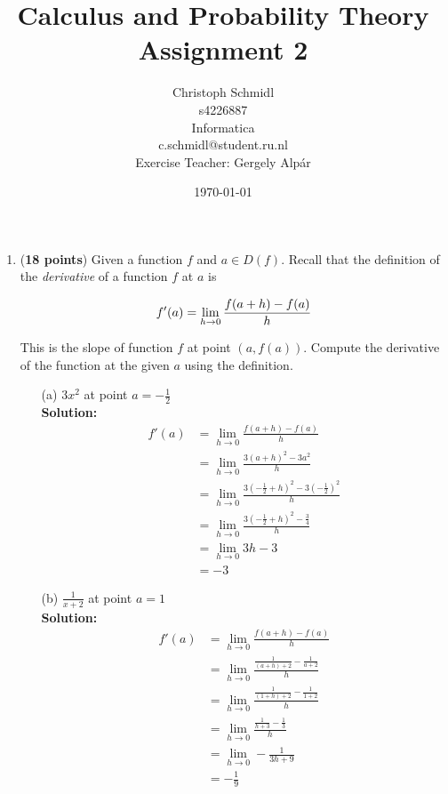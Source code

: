 \documentclass[a4paper]{article}
\title{Calculus and Probability Theory\\ Assignment 2}
\author{Christoph Schmidl\\
s4226887\\
Informatica\\
c.schmidl@student.ru.nl\\
Exercise Teacher: Gergely Alp\'{a}r}
\date{\today}
\begin{document}
\maketitle

\begin{enumerate}

\item (\textbf{18 points}) Given a function $f$ and $a \in D(f)$. Recall that the definition of the \textit{derivative} of a function $f$ at $a$ is 

\begin{equation}
	f'(a) = \lim_{h \to 0} \frac{f(a + h) - f(a)}{h} \notag
\end{equation}

This is the slope of function $f$ at point $(a, f(a))$. Compute the derivative of the function at the given $a$ using the definition.

\begin{enumerate}
	\item[(a)] $3x^2$ at point $a = -\frac{1}{2}$\\
	\textbf{Solution:}\\
	
	
\begin{align*}
	f'(a) &= \lim_{h \to 0} \frac{f(a + h) - f(a)}{h}\\
	&= \lim_{h \to 0} \frac{3(a + h)^2 - 3a^2}{h}\\
	&= \lim_{h \to 0} \frac{3(-\frac{1}{2} + h)^2 - 3(-\frac{1}{2})^2}{h}\\
	&= \lim_{h \to 0} \frac{3(-\frac{1}{2} + h)^2 - \frac{3}{4}}{h}\\
	&= \lim_{h \to 0} 3h - 3\\
	&= -3
\end{align*}
	
	
	\item[(b)] $\frac{1}{x + 2}$ at point $a = 1$\\
	\textbf{Solution:}\\
	
\begin{align*}
	f'(a) &= \lim_{h \to 0} \frac{f(a + h) - f(a)}{h}\\
	&= \lim_{h \to 0} \frac{\frac{1}{(a + h) + 2} - \frac{1}{a + 2}}{h}\\
	&= \lim_{h \to 0} \frac{\frac{1}{(1 + h) + 2} - \frac{1}{1 + 2}}{h}\\
	&= \lim_{h \to 0} \frac{\frac{1}{h + 3} - \frac{1}{3}}{h}\\
	&= \lim_{h \to 0} -\frac{1}{3h + 9}\\
	&= - \frac{1}{9}
\end{align*}	
	

\end{enumerate}
\end{enumerate}
\end{document}
